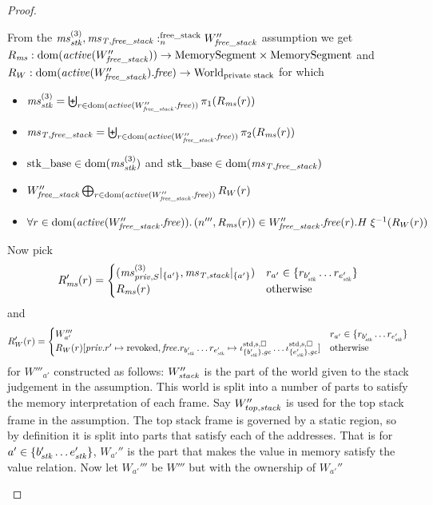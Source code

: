 \begin{proof}
\begin{description}
\begin{itemize}
\begin{itemize}
\begin{itemize}
          From the $\mathit{ms}^{(3)}_{\mathit{stk}},\mathit{ms}_{\mathit{T,free\_stack}} :_{n}^{\text{free\_stack}}W_{\mathit{free\_stack}}''$ assumption we get $R_\ms : \dom(\activeReg{W_{\var{free\_stack}}''}) \fun \MemSeg \times \MemSeg$ and $R_W : \dom(\activeReg{W_{\var{free\_stack}}''}.\free) \fun \Worlds$ for which
          \begin{itemize}
          \item $\ms^{(3)}_\stk = \biguplus_{r \in \dom(\activeReg{W_{\var{free\_stack}}''.\free})} \pi_1(R_\ms(r))$
          \item $\ms_\var{T,free\_stack} = \biguplus_{r \in \dom(\activeReg{W_{\var{free\_stack}}''.\free})} \pi_2(R_\ms(r))$
          \item $\mathrm{stk\_base} \in \mathrm{dom}(\mathit{ms}^{(3)}_{\mathit{stk}})$ and $\mathrm{stk\_base} \in \mathrm{dom}(\mathit{ms}_{\mathit{T,free\_stack}})$
          \item $W_{\var{free\_stack}}'' \bigoplus_{r \in \dom(\activeReg{W_{\var{free\_stack}}''.\free})} R_W(r)$
          \item $\forall r \in \dom(\activeReg{W_{\var{free\_stack}}''.\free})\ldotp \npair[n''']{R_\ms(r)} \in W_{\var{free\_stack}}''.\free(r).H \; \xi^{-1}(R_W(r))$
          \end{itemize}
          Now pick
          \[
            R_{\mathit{ms}}'(r) =
            \begin{cases}
              (\mathit{ms}_{\mathit{priv},S}^{(3)}|_{\{a'\}} , \mathit{ms}_{\mathit{T,stack}}|_{\{a'\}}) & r_{a'} \in \{r_{b_{\mathit{stk}}'}\dots r_{e_{\mathit{stk}}'}\}\\
              R_{\mathit{ms}}(r) & \text{otherwise }
            \end{cases}
          \]
          and
          \[
            R_W'(r) =
            \begin{cases}
              W'''_{a'} & r_{a'} \in \{r_{b_{\mathit{stk}}'}\dots r_{e_{\mathit{stk}}'}\} \\
              R_W(r)[\mathit{priv}.r' \mapsto \mathrm{revoked},\mathit{free}.r_{b_{\mathit{stk}}'}\dots r_{e_{\mathit{stk}}'}\mapsto \iota^{\mathrm{std},\mathrm{s},\square}_{\{b_{\mathit{stk}}'\},\mathit{gc}} \dots \iota^{\mathrm{std},\mathrm{s},\square}_{\{e_{\mathit{stk}}'\},\mathit{gc}}]& \text{otherwise }
            \end{cases}
          \]
          for $W'''_{a'}$ constructed as follows: $W_{\mathit{stack}}''$ is the part of the world given to the stack judgement in the assumption.
          This world is split into a number of parts to satisfy the memory interpretation of each frame.
          Say $W_{top,\mathit{stack}}''$ is used for the top stack frame in the assumption.
          The top stack frame is governed by a static region, so by definition it is split into parts that satisfy each of the addresses.
          That is for $a' \in \{b_{\mathit{stk}}' \dots e_{\mathit{stk}}'\}$, $W_{a'}''$ is the part that makes the value in memory satisfy the value relation.
          Now let $W_{a'}'''$ be $W'''$ but with the ownership of $W_{a'}''$


\end{itemize}
\end{itemize}
\end{itemize}
\end{description}
\end{proof}
